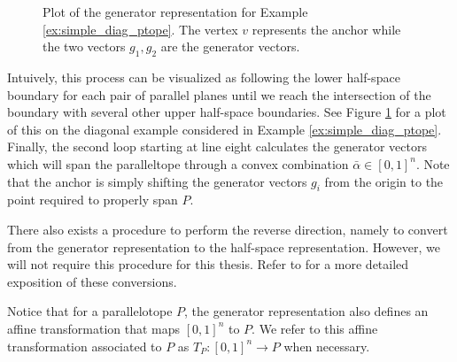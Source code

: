 %
\begin{figure}[h!]
  \centering
  \caption{Plot of the generator representation for Example \ref{ex:simple_diag_ptope}. The vertex $v$ represents the anchor while the two vectors $g_1,g_2$ are the generator vectors.}
  \label{fig:axis_align_gen}
\end{figure}
%
Intuively, this process can be visualized as following the lower half-space boundary for each pair of parallel planes until we reach the intersection of the boundary with several other upper half-space boundaries.
%
See Figure \ref{fig:axis_align_gen} for a plot of this on the diagonal example considered in Example \ref{ex:simple_diag_ptope}.
%
Finally, the second loop starting at line eight calculates the generator vectors which will span the paralleltope through a convex combination $\bar{\alpha} \in [0,1]^n$. Note that the anchor is simply shifting the  generator vectors $g_i$ from the origin to the point required to properly span $P$.

There also exists a procedure to perform the reverse direction, namely to convert from the generator representation to the half-space representation. However, we will not require this procedure for this thesis. Refer to \cite{dang2014parameter} for a more detailed exposition of these conversions.

\begin{remark}
Notice that for a parallelotope $P$, the generator representation also defines an affine transformation that maps $[0,1]^{n}$ to $P$.
%
We refer to this affine transformation associated to $P$ as $T_P:[0,1]^n \rightarrow P$ when necessary.
\end{remark}



